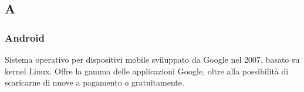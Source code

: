 \subsection*{\textbf{\hfill \Huge{A} \hfill}} 
\subsubsection*{Android}
Sistema operativo per dispositivi mobile sviluppato da Google nel 2007, basato su kernel Linux. Offre la gamma delle applicazioni Google, oltre alla possibilità di scaricarne di nuove a pagamento o gratuitamente.